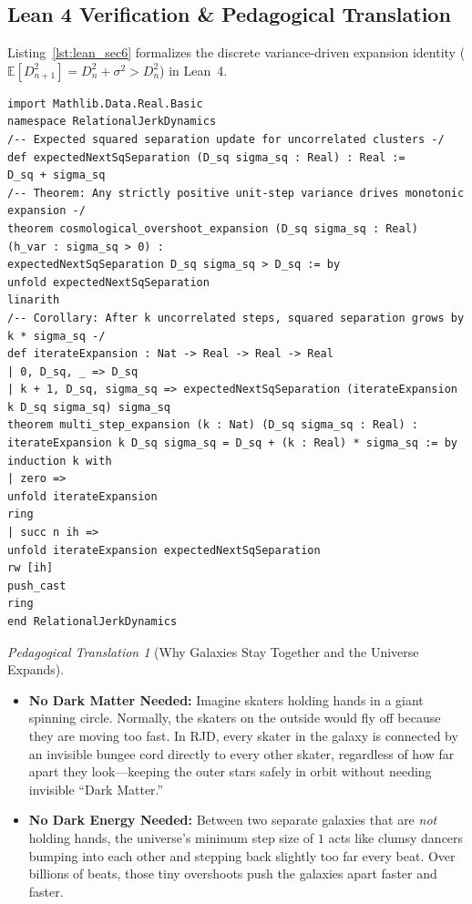 \documentclass[11pt,a4paper]{article}
\theoremstyle{plain}
\theoremstyle{definition}
\theoremstyle{remark}
\newtheorem{analogy}{Pedagogical Translation}[section]
\begin{document}
\clearpage

\subsection{Lean 4 Verification \& Pedagogical Translation}
Listing~\ref{lst:lean_sec6} formalizes the discrete variance-driven expansion identity ($\mathbb{E}[D_{n+1}^2] = D_n^2 + \sigma^2 > D_n^2$) in Lean~4.
\begin{lstlisting}[caption={Lean 4 proof that uncorrelated unit-step overshoot strictly increases squared separation.},label={lst:lean_sec6}]
import Mathlib.Data.Real.Basic
namespace RelationalJerkDynamics
/-- Expected squared separation update for uncorrelated clusters -/
def expectedNextSqSeparation (D_sq sigma_sq : Real) : Real :=
D_sq + sigma_sq
/-- Theorem: Any strictly positive unit-step variance drives monotonic expansion -/
theorem cosmological_overshoot_expansion (D_sq sigma_sq : Real)
(h_var : sigma_sq > 0) :
expectedNextSqSeparation D_sq sigma_sq > D_sq := by
unfold expectedNextSqSeparation
linarith
/-- Corollary: After k uncorrelated steps, squared separation grows by k * sigma_sq -/
def iterateExpansion : Nat -> Real -> Real -> Real
| 0, D_sq, _ => D_sq
| k + 1, D_sq, sigma_sq => expectedNextSqSeparation (iterateExpansion k D_sq sigma_sq) sigma_sq
theorem multi_step_expansion (k : Nat) (D_sq sigma_sq : Real) :
iterateExpansion k D_sq sigma_sq = D_sq + (k : Real) * sigma_sq := by
induction k with
| zero =>
unfold iterateExpansion
ring
| succ n ih =>
unfold iterateExpansion expectedNextSqSeparation
rw [ih]
push_cast
ring
end RelationalJerkDynamics
\end{lstlisting}
\begin{analogy}[Why Galaxies Stay Together and the Universe Expands]
\begin{itemize}
\item \textbf{No Dark Matter Needed:} Imagine skaters holding hands in a giant spinning circle. Normally, the skaters on the outside would fly off because they are moving too fast. In RJD, every skater in the galaxy is connected by an invisible bungee cord directly to every other skater, regardless of how far apart they look—keeping the outer stars safely in orbit without needing invisible ``Dark Matter.''
\item \textbf{No Dark Energy Needed:} Between two separate galaxies that are \emph{not} holding hands, the universe's minimum step size of $1$ acts like clumsy dancers bumping into each other and stepping back slightly too far every beat. Over billions of beats, those tiny overshoots push the galaxies apart faster and faster.
\end{itemize}
\end{analogy}
\end{document}
